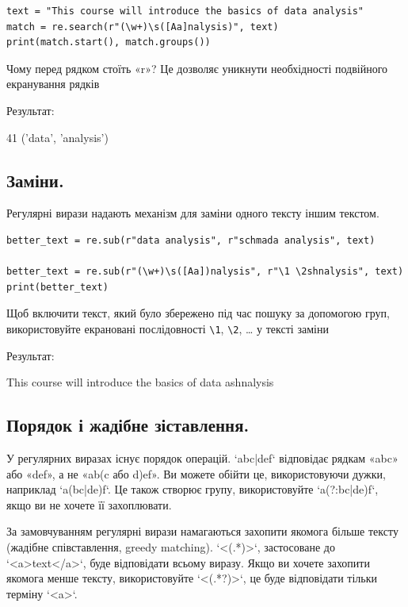\begin{lstlisting}
text = "This course will introduce the basics of data analysis"
match = re.search(r"(\w+)\s([Aa]nalysis)", text)
print(match.start(), match.groups())
\end{lstlisting}

Чому перед рядком стоїть «r»? Це дозволяє уникнути необхідності подвійного екранування рядків

Результат:

\begin{console}
41 ('data', 'analysis')
\end{console}


\subsection{Заміни.}

Регулярні вирази надають механізм для заміни одного тексту іншим текстом.

\begin{lstlisting}
better_text = re.sub(r"data analysis", r"schmada analysis", text)

better_text = re.sub(r"(\w+)\s([Aa])nalysis", r"\1 \2shnalysis", text)
print(better_text)
\end{lstlisting}

Щоб включити текст, який було збережено під час пошуку за допомогою груп, використовуйте екрановані послідовності 
\verb|\1|, \verb|\2|, … у тексті заміни

Результат:

\begin{console}
This course will introduce the basics of data ashnalysis
\end{console}


\subsection{Порядок і жадібне зіставлення.}

У регулярних виразах існує порядок операцій. `abc|def` відповідає рядкам «abc» або «def», а не 
«ab(c або d)ef». Ви можете обійти це, використовуючи дужки, наприклад `a(bc|de)f`. Це 
також створює групу, використовуйте `a(?:bc|de)f`, якщо ви не хочете її захоплювати.

За замовчуванням регулярні вирази намагаються захопити якомога більше тексту 
(жадібне співставлення, greedy matching). `<(.*)>`, застосоване до `<a>text</a>`, буде відповідати всьому виразу. 
Якщо ви хочете захопити якомога менше тексту, використовуйте `<(.*?)>`, це буде відповідати тільки 
терміну `<a>`.





